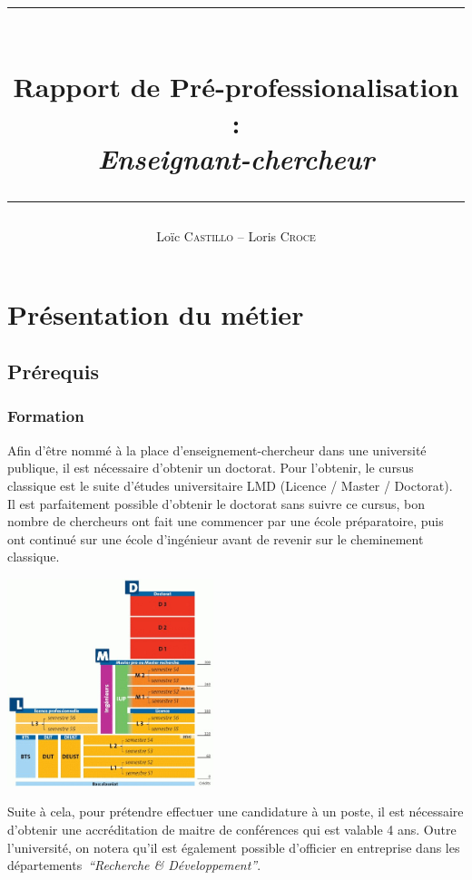 \documentclass[14pt, a4paper]{report}
\author{Loïc \textsc{Castillo} -- Loris \textsc{Croce}}
\title{\rule{\textwidth}{1pt} \\ \Huge\textbf{Rapport de Pré-professionalisation : } \\ \emph{Enseignant-chercheur} \rule{\textwidth}{1pt}}
\newenvironment{Figure}
  {\par\medskip\noindent\minipage{\linewidth}}
  {\endminipage\par\medskip}
\begin{document}
\maketitle{}

\tableofcontents

\chapter{Présentation du métier}

  \section{Prérequis}

    \subsection{Formation}

    Afin d'être nommé à la place d'enseignement-chercheur dans une université publique, il est nécessaire d'obtenir un doctorat. Pour l'obtenir, le cursus classique est le suite d'études universitaire LMD (Licence / Master / Doctorat).
    Il est parfaitement possible d'obtenir le doctorat sans suivre ce cursus, bon nombre de chercheurs ont fait une commencer par une école préparatoire, puis ont continué sur une école d'ingénieur avant de revenir sur le cheminement classique.

    \begin{Figure}
      \centering
      \includegraphics[width=6cm]{lmd.jpg}
    \end{Figure}

    \medskip

    Suite à cela, pour prétendre effectuer une candidature à un poste, il est nécessaire d'obtenir une accréditation de maitre de conférences qui est valable 4 ans.
		Outre l'université, on notera qu'il est également possible d'officier en entreprise dans les départements\ \emph{“Recherche \& Développement”}.
\end{document}
